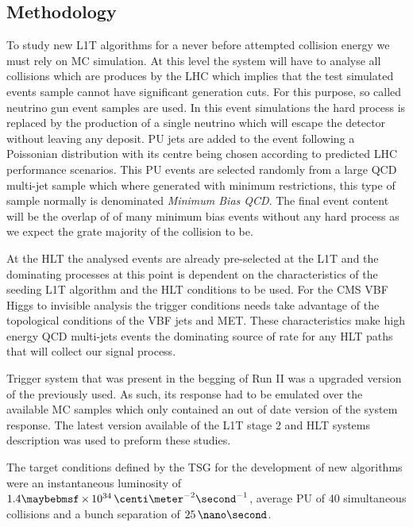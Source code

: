 \subsection{Methodology}
\label{SECTION:RunIITriggerStudies_Methodology}


To study new \gls{L1T} algorithms for a never before attempted collision energy we must rely on \gls{MC} simulation. At this level the system will have to analyse all collisions which are produces by the \gls{LHC} which implies that the test simulated events sample cannot have significant generation cuts. For this purpose, so called neutrino gun event samples are used. In this event simulations the hard process is replaced by the production of a single neutrino which will escape the detector without leaving any deposit. \acrfull{PU} jets are added to the event following a Poissonian distribution with its centre being chosen according to predicted \gls{LHC} performance scenarios. This \gls{PU} events are selected randomly from a large \gls{QCD} multi-jet sample which where generated with minimum restrictions, this type of sample normally is denominated \textit{Minimum Bias QCD}. The final event content will be the overlap of of many minimum bias events without any hard process as we expect the grate majority of the collision to be.

At the \gls{HLT} the analysed events are already pre-selected at the \gls{L1T} and the dominating processes at this point is dependent on the characteristics of the seeding \gls{L1T} algorithm and the \gls{HLT} conditions to be used. For the \gls{CMS} \gls{VBF} Higgs to invisible analysis the trigger conditions needs take advantage of the topological conditions of the \gls{VBF} jets and \gls{MET}. These characteristics make high energy \gls{QCD} multi-jets events the dominating source of rate for any \gls{HLT} paths that will collect our signal process.

Trigger system that was present in the begging of Run II was a upgraded version of the previously used. As such, its response had to be emulated over the available \gls{MC} samples which only contained an out of date version of the system response. The latest version available of the \gls{L1T} stage 2 and \gls{HLT} systems description was used to preform these studies.

The target conditions defined by the \gls{TSG} for the development of new algorithms were an instantaneous luminosity of  $1.4 \times 10^{34}\,\centi\meter^{-2}\second^{-1}$, average \gls{PU} of 40 simultaneous collisions and a bunch separation of $25\,\nano\second$.

